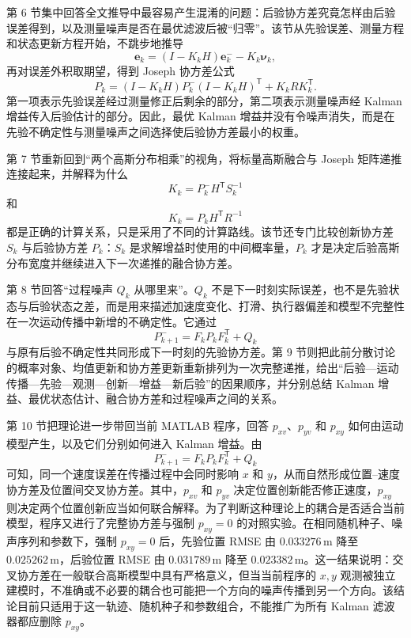 \documentclass[UTF8,a4paper,11pt]{ctexart}
\newcommand{\prior}{^{-}}
\newcommand{\transpose}{^{\mathsf T}}
\begin{document}
第 6 节集中回答全文推导中最容易产生混淆的问题：后验协方差究竟怎样由后验误差得到，以及测量噪声是否在最优滤波后被“归零”。该节从先验误差、测量方程和状态更新方程开始，不跳步地推导
\begin{equation}
\bm e_k=(I-K_kH)\bm e_k\prior-K_k\bm\nu_k,
\end{equation}
再对误差外积取期望，得到 Joseph 协方差公式
\begin{equation}
P_k
=(I-K_kH)P_k\prior(I-K_kH)\transpose
+K_kRK_k\transpose.
\end{equation}
第一项表示先验误差经过测量修正后剩余的部分，第二项表示测量噪声经 Kalman 增益传入后验估计的部分。因此，最优 Kalman 增益并没有令噪声消失，而是在先验不确定性与测量噪声之间选择使后验协方差最小的权重。

第 7 节重新回到“两个高斯分布相乘”的视角，将标量高斯融合与 Joseph 矩阵递推连接起来，并解释为什么
\begin{equation}
K_k=P_k\prior H\transpose S_k^{-1}
\end{equation}
和
\begin{equation}
K_k=P_kH\transpose R^{-1}
\end{equation}
都是正确的计算关系，只是采用了不同的计算路线。该节还专门比较创新协方差 $S_k$ 与后验协方差 $P_k$：$S_k$ 是求解增益时使用的中间概率量，$P_k$ 才是决定后验高斯分布宽度并继续进入下一次递推的融合协方差。

第 8 节回答“过程噪声 $Q_k$ 从哪里来”。$Q_k$ 不是下一时刻实际误差，也不是先验状态与后验状态之差，而是用来描述加速度变化、打滑、执行器偏差和模型不完整性在一次运动传播中新增的不确定性。它通过
\begin{equation}
P_{k+1}\prior=F_kP_kF_k\transpose+Q_k
\end{equation}
与原有后验不确定性共同形成下一时刻的先验协方差。第 9 节则把此前分散讨论的概率对象、均值更新和协方差更新重新排列为一次完整递推，给出“后验---运动传播---先验---观测---创新---增益---新后验”的因果顺序，并分别总结 Kalman 增益、最优状态估计、融合协方差和过程噪声之间的关系。

第 10 节把理论进一步带回当前 MATLAB 程序，回答 $p_{xv}$、$p_{yv}$ 和 $p_{xy}$ 如何由运动模型产生，以及它们分别如何进入 Kalman 增益。由
\begin{equation}
P_{k+1}\prior=F_kP_kF_k\transpose+Q_k
\end{equation}
可知，同一个速度误差在传播过程中会同时影响 $x$ 和 $y$，从而自然形成位置--速度协方差及位置间交叉协方差。其中，$p_{xv}$ 和 $p_{yv}$ 决定位置创新能否修正速度，$p_{xy}$ 则决定两个位置创新应当如何联合解释。为了判断这种理论上的耦合是否适合当前模型，程序又进行了完整协方差与强制 $p_{xy}=0$ 的对照实验。在相同随机种子、噪声序列和参数下，强制 $p_{xy}=0$ 后，先验位置 RMSE 由 $0.033276\,\mathrm m$ 降至 $0.025262\,\mathrm m$，后验位置 RMSE 由 $0.031789\,\mathrm m$ 降至 $0.023382\,\mathrm m$。这一结果说明：交叉协方差在一般联合高斯模型中具有严格意义，但当当前程序的 $x,y$ 观测被独立建模时，不准确或不必要的耦合也可能把一个方向的噪声传播到另一个方向。该结论目前只适用于这一轨迹、随机种子和参数组合，不能推广为所有 Kalman 滤波器都应删除 $p_{xy}$。
\end{document}
